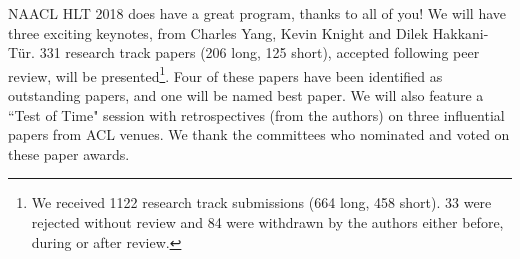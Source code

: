 NAACL HLT 2018 does have a great program, thanks to all of you! 
We will have three exciting keynotes, from Charles Yang, Kevin Knight and Dilek Hakkani-T\"ur. 
331 research track papers (206 long, 125 short), accepted following peer review, will be presented\footnote{We received 1122 research track submissions (664 long, 458 short). 33 were rejected without review and 84 were withdrawn by the authors either before, during or after review.}. Four of these papers have been identified as outstanding papers, and one will be named best paper. 
We will also feature a ``Test of Time" session with retrospectives (from the authors) on three influential papers from ACL venues. We thank the committees who nominated and voted on these paper awards.
